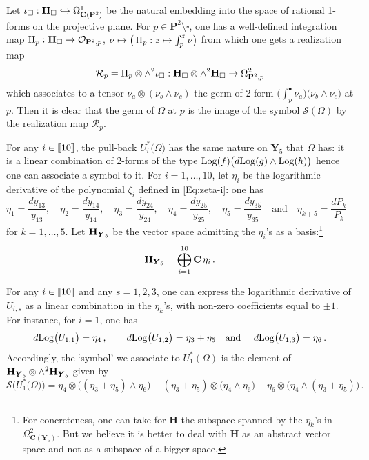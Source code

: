 \documentclass[11pt]{amsart}
\begin{document}
Let $\iota_{\square}: {\bf H}_{\square}\hookrightarrow \Omega^1_{\mathbf C(\mathbf P^2)}$ be the natural embedding into the space of rational 1-forms on the projective plane.  For $p\in \mathbf P^2\setminus \square$, one has a well-defined integration map 
${\rm II}_p : {\bf H}_{\square}\rightarrow \mathcal O_{\mathbf P^2,p}$, $\nu\mapsto 
\big(\, {\rm II}_p : z\mapsto 
\int_{p}^z \nu\big)$ from which one gets a realization map 
$$\mathcal R_p= {\rm II}_p \otimes \wedge^2 \iota_{\square} : {\bf H}_{\square} \otimes \wedge^2 {\bf H}_{\square}\rightarrow \Omega^2_{\mathbf P^2,p}$$ which associates to 
a tensor $\nu_a\otimes ( \nu_b\wedge \nu_c)$ the germ of 2-form $
\big(\int_{p}^\bullet \nu_a\big)
\big(\nu_b\wedge \nu_c\big)$ at $p$. Then it is clear that 
the germ of $\Omega$ at $p$ is the image of the symbol $\mathcal S(\Omega)$ by the 
realization map $\mathcal R_p$.




For any $i\in [\hspace{-0.05cm}[ 10  ]\hspace{-0.05cm}]$, the pull-back $U_i^*\big( \Omega\big)$ has the same nature on $\boldsymbol{Y}_5$ that $\Omega$ has: it is a linear combination of 2-forms of the type ${\rm Log}(f) \big( d{\rm Log}(g) \wedge {\rm Log}(h)\big)$ hence one can associate a symbol to it. For $i=1,\ldots,10$, let $\eta_i$ be the logarithmic derivative of the 
 polynomial $\zeta_i$ defined in \eqref{Eq:zeta-i}: one has 
 $$
 \eta_1=\frac{dy_{13}}{y_{13}},\quad 
  \eta_2=\frac{dy_{14}}{y_{14}},\quad 
  \eta_3=\frac{dy_{24}}{y_{24}},\quad 
  \eta_4=\frac{dy_{25}}{y_{25}},\quad 
  \eta_5=\frac{dy_{35}}{y_{35}}
  \quad 
  \mbox{and} \quad 
  \eta_{k+5}=\frac{dP_k}{P_k}\quad 
 $$
 for $k=1,\ldots,5$. Let ${\bf H}_{\boldsymbol{Y}_5}$ be the vector space admitting the $\eta_i$'s as a basis:\footnote{For concreteness, one can take for $\boldsymbol{H}$ the subspace spanned by the $\eta_k$'s in $\Omega^2_{\mathbf C( \boldsymbol{Y}_5)}$. But we believe it is better to deal with $\boldsymbol{H}$ as an abstract vector space and not as a subspace of a bigger space.} 
 $$
 {\bf H}_{\boldsymbol{Y}_5}=\bigoplus_{i=1}^{10} \mathbf C\,\eta_i\, . 
 $$
 
 For any $i\in [\hspace{-0.05cm}[ 10  ]\hspace{-0.05cm}]$ and any $s=1,2,3$,  one can express the logarithmic derivative of 
 $U_{i,s}$ as a linear combination in the $\eta_k$'s, with non-zero coefficients equal to $\pm 1$. For instance, for $i=1$, one has 
 \begin{align*}
 d {\rm Log}\big(U_{1,1}\big)=   \eta_4\, , \qquad 
  d {\rm Log}\big(U_{1,2}\big)=   \eta_3+\eta_5
  \quad 
\mbox{and } \quad   d {\rm Log}\big(U_{1,3}\big)=  \eta_6\, .
 \end{align*}
Accordingly, the `symbol'  we associate to 
 $U_1^*(\Omega)$ is the element of ${\bf H}_{\boldsymbol{Y}_5}\otimes \wedge^2
 {\bf H}_{\boldsymbol{Y}_5}$ given by 
 $$
 \mathcal S\Big(  U_1^*\big(\Omega\big)\Big)=
 \eta_4\otimes \big( (\eta_3+\eta_5) \wedge \eta_6\big)
 - (\eta_3+\eta_5) \otimes \big( \eta_4  \wedge \eta_6\big)
 +\eta_6\otimes \big(  \eta_4 \wedge (\eta_3+\eta_5) \big)\, . 
 $$
 
\end{document}
